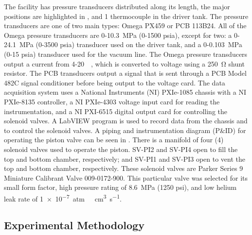 The facility has pressure transducers distributed along its length, the major positions are highlighted in , and 1 thermocouple in the driver tank.
The pressure transducers are one of two main types: Omega PX459 or PCB 113B24.
All of the Omega pressure transducers are 0-\SI{10.3}{\mega\pascal} (0-1500 psia), except for two: a 0-\SI{24.1}{\mega\pascal} (0-3500 psia) transducer used on the driver tank, and a 0-\SI{0.103}{\mega\pascal} (0-15 psia) transducer used for the vacuum line.
The Omega pressure transducers output a current from 4-\SI{20}{\milli\amp}, which is converted to voltage using a \SI{250}{\ohm} shunt resistor.
The PCB transducers output a signal that is sent through a PCB Model 482C signal conditioner before being output to the voltage card.
The data acquisition system uses a National Instruments (NI) PXIe-1085 chassis with a NI PXIe-8135 controller, a NI PXIe-4303 voltage input card for reading the instrumentation, and a NI PXI-6515 digital output card for controlling the solenoid valves.
A LabVIEW program is used to record data from the chassis and to control the solenoid valves.
A piping and instrumentation diagram (P\&ID) for operating the piston valve can be seen in .
There is a manifold of four (4) solenoid valves used to operate the piston. SV-PI2 and SV-PI4 open to fill the top and bottom chamber, respectively; and SV-PI1 and SV-PI3 open to vent the top and bottom chamber, respectively.
These solenoid valves are Parker Series 9 Miniature Calibrant Valve 009-0172-900.
This particular valve was selected for its small form factor, high pressure rating of \SI{8.6}{\mega\pascal} (1250 psi), and low helium leak rate of \SI{1e-7}{atm\ \centi\meter^3\per\second}.








\subsection{Experimental Methodology} \label{ss:methodology}


